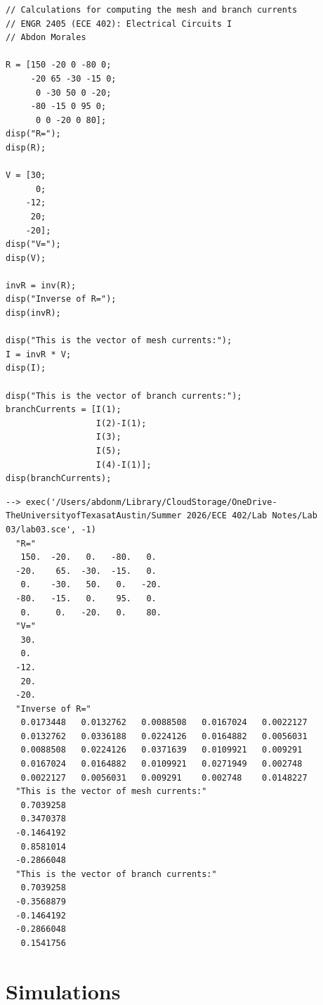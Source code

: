\documentclass[11pt]{article}
\begin{document}
\begin{lstlisting}[style=scilab, caption={SciLab program}]
// Calculations for computing the mesh and branch currents
// ENGR 2405 (ECE 402): Electrical Circuits I
// Abdon Morales

R = [150 -20 0 -80 0;
     -20 65 -30 -15 0;
      0 -30 50 0 -20;
     -80 -15 0 95 0;
      0 0 -20 0 80];
disp("R=");
disp(R);

V = [30;
      0;
    -12;
     20;
    -20];
disp("V=");
disp(V);

invR = inv(R);
disp("Inverse of R=");
disp(invR);

disp("This is the vector of mesh currents:");
I = invR * V;
disp(I);

disp("This is the vector of branch currents:");
branchCurrents = [I(1);
                  I(2)-I(1);
                  I(3);
                  I(5);
                  I(4)-I(1)];
disp(branchCurrents);
\end{lstlisting}

\begin{lstlisting}[caption={SciLab runtime output}]
--> exec('/Users/abdonm/Library/CloudStorage/OneDrive-TheUniversityofTexasatAustin/Summer 2026/ECE 402/Lab Notes/Lab 03/lab03.sce', -1)
  "R="
   150.  -20.   0.   -80.   0. 
  -20.    65.  -30.  -15.   0. 
   0.    -30.   50.   0.   -20.
  -80.   -15.   0.    95.   0. 
   0.     0.   -20.   0.    80.
  "V="
   30.
   0.
  -12.
   20.
  -20.
  "Inverse of R="
   0.0173448   0.0132762   0.0088508   0.0167024   0.0022127
   0.0132762   0.0336188   0.0224126   0.0164882   0.0056031
   0.0088508   0.0224126   0.0371639   0.0109921   0.009291 
   0.0167024   0.0164882   0.0109921   0.0271949   0.002748 
   0.0022127   0.0056031   0.009291    0.002748    0.0148227
  "This is the vector of mesh currents:"
   0.7039258
   0.3470378
  -0.1464192
   0.8581014
  -0.2866048
  "This is the vector of branch currents:"
   0.7039258
  -0.3568879
  -0.1464192
  -0.2866048
   0.1541756

\end{lstlisting}

\section*{Simulations}
\end{document}
